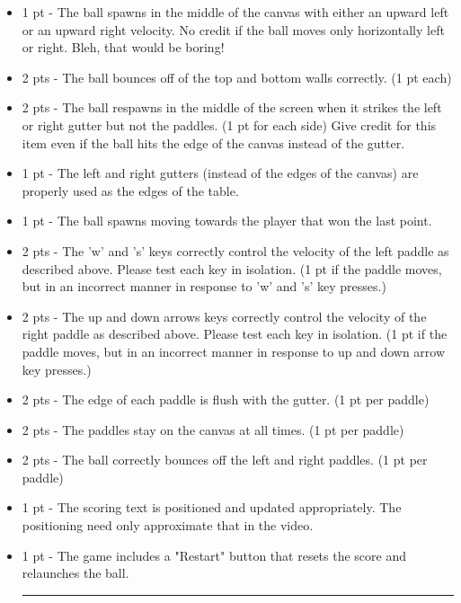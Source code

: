 \documentclass[a4paper,10pt]{article}
\begin{document}
\begin{CJK}{UTF8}{gkai}
\begin{itemize}
\item 1 pt - The ball spawns in the middle of the canvas with either an upward left or an upward right velocity. No credit if the ball moves only horizontally left or right. Bleh, that would be boring!
\item 2 pts - The ball bounces off of the top and bottom walls correctly. (1 pt each)
\item 2 pts - The ball respawns in the middle of the screen when it strikes the left or right gutter but not the paddles. (1 pt for each side) Give credit for this item even if the ball hits the edge of the canvas instead of the gutter.
\item 1 pt - The left and right gutters (instead of the edges of the canvas) are properly used as the edges of the table.
\item 1 pt - The ball spawns moving towards the player that won the last point.
\item 2 pts - The 'w' and 's' keys correctly control the velocity of the left paddle as described above. Please test each key in isolation. (1 pt if the paddle moves, but in an incorrect manner in response to 'w' and 's' key presses.)
\item 2 pts - The up and down arrows keys correctly control the velocity of the right paddle as described above. Please test each key in isolation. (1 pt if the paddle moves, but in an incorrect manner in response to up and down arrow key presses.)
\item 2 pts - The edge of each paddle is flush with the gutter. (1 pt per paddle)
\item 2 pts - The paddles stay on the canvas at all times. (1 pt per paddle)
\item 2 pts - The ball correctly bounces off the left and right paddles. (1 pt per paddle)
\item 1 pt - The scoring text is positioned and updated appropriately. The positioning need only approximate that in the video.
\item 1 pt - The game includes a "Restart" button that resets the score and relaunches the ball.

\rule{\textwidth}{0.5pt}

\end{itemize}

\medskip


\end{CJK}
\end{document}
